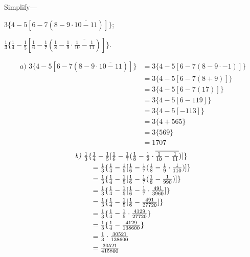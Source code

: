 \documentclass[DIN, pagenumber=false, fontsize=11pt, parskip=half]{scrartcl}
\begin{document}
\begin{problems}[from=1,step=1]
    \problem Simplify---
    \begin{parts}
        \item $3\{4 - 5[6 - 7(8 - 9 \cdot \overline{10 - 11})]\}$;
        \item $\frac{1}{3}\{\frac{1}{4} - \frac{1}{5}[\frac{1}{6} - \frac{1}{7}(\frac{1}{8} - \frac{1}{9} \cdot \overline{\frac{1}{10} - \frac{1}{11}})]\}$.
    \end{parts}

    \answer 
    \begin{align*}
        \textit{a) } 3\{4-5[6-7(8-9\cdot \overline{10-11})]\} &= 3\{4-5[6-7(8-9\cdot-1)]\}\\ 
                                                              &= 3\{4-5[6-7(8+9)]\}\\ 
                                                              &= 3\{4-5[6-7(17)]\}\\ 
                                                              &= 3\{4-5[6-119]\}\\ 
                                                              &= 3\{4-5[-113]\}\\ 
                                                              &= 3\{4+565\}\\ 
                                                              &= 3\{569\}\\ 
                                                              &= 1707
    \end{align*}
    \begin{align*}
        \textit{b) } \MoveEqLeft[1] \tfrac{1}{3}\{\tfrac{1}{4} - \tfrac{1}{5}[\tfrac{1}{6} - \tfrac{1}{7}(\tfrac{1}{8} - \tfrac{1}{9} \cdot \overline{\tfrac{1}{10} - \tfrac{1}{11}})]\} \\
            &= \tfrac{1}{3}\{\tfrac{1}{4} - \tfrac{1}{5}[\tfrac{1}{6} - \tfrac{1}{7}(\tfrac{1}{8} - \tfrac{1}{9} \cdot \tfrac{1}{110})]\} \\
            &= \tfrac{1}{3}\{\tfrac{1}{4} - \tfrac{1}{5}[\tfrac{1}{6} - \tfrac{1}{7}(\tfrac{1}{8} - \tfrac{1}{990})]\} \\
            &= \tfrac{1}{3}\{\tfrac{1}{4} - \tfrac{1}{5}[\tfrac{1}{6} - \tfrac{1}{7} \cdot \tfrac{491}{3960}]\} \\
            &= \tfrac{1}{3}\{\tfrac{1}{4} - \tfrac{1}{5}[\tfrac{1}{6} - \tfrac{491}{27720}]\} \\
            &= \tfrac{1}{3}\{\tfrac{1}{4} - \tfrac{1}{5} \cdot \tfrac{4129}{27720}\} \\
            &= \tfrac{1}{3}\{\tfrac{1}{4} - \tfrac{4129}{138600}\} \\
            &= \tfrac{1}{3} \cdot \tfrac{30521}{138600} \\
            &= \tfrac{30521}{415800}
    \end{align*}


\end{problems}
\end{document}

